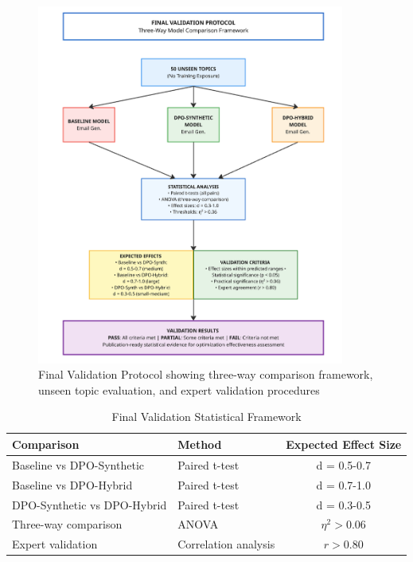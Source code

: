 \begin{figure}[H]
    \centering
    \includegraphics[width=0.9\textwidth]{figures/final_val.png}
    \caption{Final Validation Protocol showing three-way comparison framework, unseen topic evaluation, and expert validation procedures}
    \label{fig:final-validation-protocol}
\end{figure}

\begin{table}[H]
    \centering
    \caption{Final Validation Statistical Framework}
    \label{tab:final-validation-framework}
    \begin{tabular}{|l|l|c|}
    \hline
    \textbf{Comparison} & \textbf{Method} & \textbf{Expected Effect Size} \\
    \hline
    Baseline vs DPO-Synthetic & Paired t-test & d = 0.5-0.7 \\
    Baseline vs DPO-Hybrid & Paired t-test & d = 0.7-1.0 \\
    DPO-Synthetic vs DPO-Hybrid & Paired t-test & d = 0.3-0.5 \\
    Three-way comparison & ANOVA & $\eta^2 > 0.06$  \\
    Expert validation & Correlation analysis & $r > 0.80$ \\
    \hline
    \end{tabular}
\end{table}

